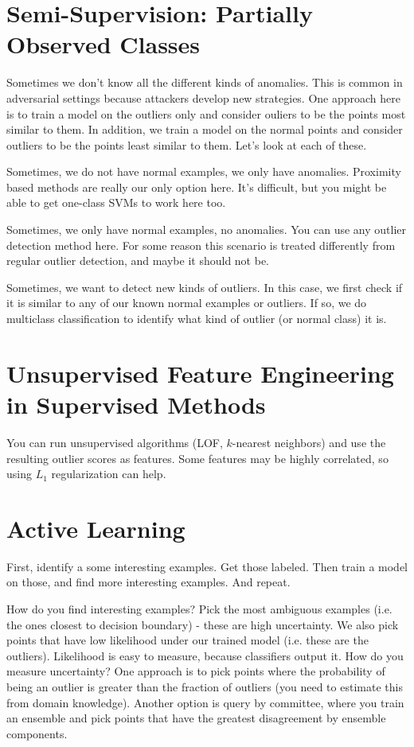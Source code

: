 \documentclass[a4paper]{article}
\begin{document}
\section{Semi-Supervision: Partially Observed Classes}
Sometimes we don't know all the different kinds of anomalies. This is common
in adversarial settings because attackers develop new strategies. One approach
here is to train a model on the outliers only and consider ouliers to be the
points most similar to them. In addition, we train a model on the normal
points and consider outliers to be the points least similar to them. Let's
look at each of these.

Sometimes, we do not have normal examples, we only have anomalies. Proximity
based methods are really our only option here. It's difficult, but you might
be able to get one-class SVMs to work here too.

Sometimes, we only have normal examples, no anomalies. You can use any outlier
detection method here. For some reason this scenario is treated differently
from regular outlier detection, and maybe it should not be.

Sometimes, we want to detect new kinds of outliers. In this case, we first
check if it is similar to any of our known normal examples or outliers. If so,
we do multiclass classification to identify what kind of outlier (or normal
class) it is.

\section{Unsupervised Feature Engineering in Supervised Methods}
You can run unsupervised algorithms (LOF, $k$-nearest neighbors)
and use the resulting outlier scores as features. Some features may be
highly correlated, so using $L_1$ regularization can help.

\section{Active Learning}
First, identify a some interesting examples. Get those labeled. Then train a
model on those, and find more interesting examples. And repeat.

How do you find interesting examples? Pick the most ambiguous examples (i.e.
the ones closest to decision boundary) - these are high uncertainty. We also
pick points that have low likelihood under our trained model (i.e. these
are the outliers). Likelihood is easy to measure, because classifiers output
it. How do you measure uncertainty? One approach is to pick points where the
probability of being an outlier is greater than the fraction of outliers
(you need to estimate this from domain knowledge). Another option is
query by committee, where you train an ensemble and pick points that have the
greatest disagreement by ensemble components.
\end{document}
